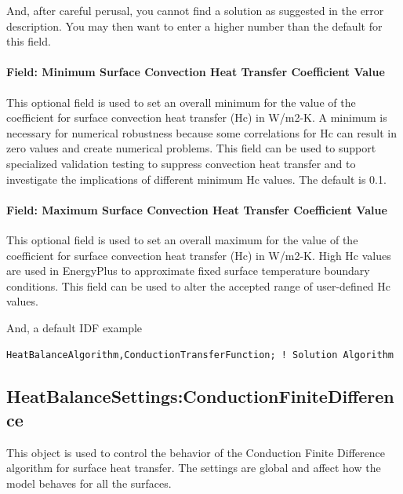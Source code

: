 And, after careful perusal, you cannot find a solution as suggested in the error description. You may then want to enter a higher number than the default for this field.

\paragraph{Field: Minimum Surface Convection Heat Transfer Coefficient Value}\label{field-minimum-surface-convection-heat-transfer-coefficient-value}

This optional field is used to set an overall minimum for the value of the coefficient for surface convection heat transfer (Hc) in W/m2-K. A minimum is necessary for numerical robustness because some correlations for Hc can result in zero values and create numerical problems. This field can be used to support specialized validation testing to suppress convection heat transfer and to investigate the implications of different minimum Hc values. The default is 0.1.

\paragraph{Field: Maximum Surface Convection Heat Transfer Coefficient Value}\label{field-maximum-surface-convection-heat-transfer-coefficient-value}

This optional field is used to set an overall maximum for the value of the coefficient for surface convection heat transfer (Hc) in W/m2-K. High Hc values are used in EnergyPlus to approximate fixed surface temperature boundary conditions. This field can be used to alter the accepted range of user-defined Hc values.

And, a default IDF example

\begin{lstlisting}
HeatBalanceAlgorithm,ConductionTransferFunction; ! Solution Algorithm
\end{lstlisting}

\subsection{HeatBalanceSettings:ConductionFiniteDifference}\label{heatbalancesettingsconductionfinitedifference}

This object is used to control the behavior of the Conduction Finite Difference algorithm for surface heat transfer. The settings are global and affect how the model behaves for all the surfaces.

